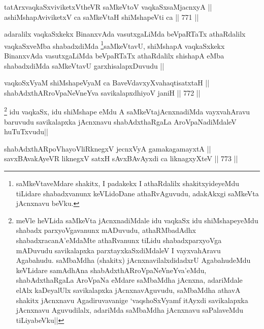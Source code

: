 
\begin{shl}
tatArxvaqkaSxviviketxV\s theVR saMkeVtoV vaqkaSxsaMjacnxyA || \\
ashiMshapAviviketxV ca saMkeVtaH shiMshapeVti ca ||  771 ||  
\end{shl}

\begin{artha}
adaralilx vaqkaSxkekx BinanxvAda vasutxgaLiMda beVpaRTaTx athaRdalilx vaqkaSxveMba shabadxdiMda \footnote{saMkeVtaveMdare shakitx, I padakekx I athaRdalilx shakitxyideyeMdu tiLidare shabadxvanunx keVLidoDane athaRvAguvudu, adakAkxgi saMkeVta jAcnxnavu beVku.}saMkeVtavU, shiMshapA vaqkaSxkekx BinanxvAda vasutxgaLiMda beVpaRTaTx athaRdalilx shishapA eMba shabadxdiMda saMkeVtavU garxhisalapxDuvudu ||
\end{artha}


\begin{shl}
vaqkoSxV\s yaM shiMshapeVyaM ca BaveVdavxyXvahaqtisatxtaH ||  \\
shabAdxthARroVpaNeVneYva savikalapxdhiyoV janiH ||  772 ||  
\end{shl}

\begin{artha}
\footnote{meVle heVLida saMkeVta jAcnxnadiMdale idu vaqkaSx idu shiMshapeyeMdu shabadx parxyoVgavanunx mADuvudu, athaRMbadAdhx shabadxracanA'eMdaMte athaRvanunx tiLidu shabadxparxyoVga mADuvudu savikalapxka parxtayxkaSxdiMdaleV I vayxvahAravu Agabahudu. saMbaMdha (shakitx) jAcnxnavilalxdidadxrU AgabahudeMdu keVLidare samAdhAna shabAdxthARroVpaNeVneYva'eMdu, shabAdxthaRgaLa AroVpaNa eMdare saMbaMdha jAcnxna, adariMdale elAlx kaDeyalUlx savikalapxka jAcnxnavAguvudu, saMbaMdha athavA shakitx jAcnxnavu Agadiruvavanige `vaqshoSxV\s yamf itAyxdi savikalapxka jAcnxnavu Aguvudilalx, adariMda saMbaMdha jAcnxnavu saPalaveMdu tiLiyabeVku||}
idu vaqkaSx, idu shiMshape eMdu A saMkeVtajAcnxnadiMda vayxvahAravu baruvudu savikalapxka jAcnxnavu shabAdxthaRgaLa AroVpaNadiMdaleV huTuTxvudu||
\end{artha}

\begin{shl}
shabAdxthARpoVhayoVliRknegxV jecnxVyA gamakagamayxtA || \\
savxBAvakAyeVR liknegxV satxH sAvxBAvAyxdi ca liknagxyXteV ||  773 ||  
\end{shl}

